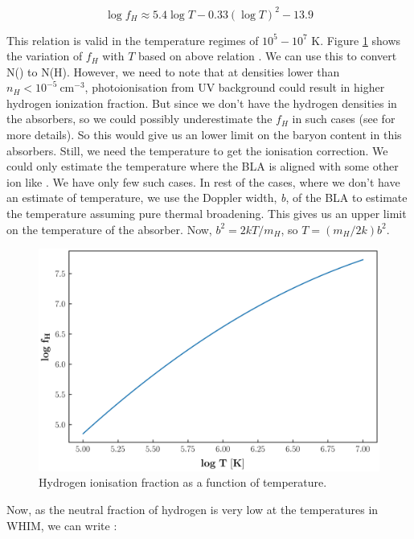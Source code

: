 \begin{equation} 
    \log f_H \approx 5.4 \log T - 0.33(\log T)^2 -13.9
\end{equation}

This relation is valid in the temperature regimes of $10^5-10^7$ K. Figure \ref{fig:fH} shows the variation of $f_H$ with $T$ based on above relation . We can use this to convert N() to N(H). However, we need to note that at densities lower than $n_H < 10^{-5} \ \text{cm}^{-3}$, photoionisation from UV background could result in higher hydrogen ionization fraction. But since we don't have the hydrogen densities in the absorbers, so we could possibly underestimate the $f_H$ in such cases (see \citet{Richter_2020, Fang-2001} for more details). So this would give us an lower limit on the baryon content in this absorbers. Still, we need the temperature to get the ionisation correction. We could only estimate the temperature where the BLA is aligned with some other ion like . We have only few such cases. In rest of the cases, where we don't have an estimate of temperature, we use the Doppler width, \emph{b}, of the BLA to estimate the temperature assuming pure thermal broadening. This gives us an upper limit on the temperature of the absorber. Now, $b^2=2kT/m_H$, so $T=(m_H / 2k) b^2 $. 

\begin{figure}[t]
    \centering
    \includegraphics[width=\linewidth]{Figures/fH_vs_T.png}
    \caption{Hydrogen ionisation fraction as a function of temperature.}
    \label{fig:fH}
\end{figure}

Now, as the neutral fraction of hydrogen is very low at the temperatures in WHIM, we can write :

